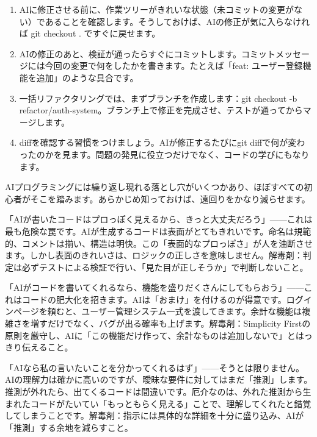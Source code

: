 \begin{enumerate}
  \item AIに修正させる前に、作業ツリーがきれいな状態（未コミットの変更がない）であることを確認します。そうしておけば、AIの修正が気に入らなければ git checkout . ですぐに戻せます。
  \item AIの修正のあと、検証が通ったらすぐにコミットします。コミットメッセージには今回の変更で何をしたかを書きます。たとえば「feat: ユーザー登録機能を追加」のような具合です。
  \item 一括リファクタリングでは、まずブランチを作成します：git checkout -b refactor/auth-system。ブランチ上で修正を完成させ、テストが通ってからマージします。
  \item diffを確認する習慣をつけましょう。AIが修正するたびにgit diffで何が変わったのかを見ます。問題の発見に役立つだけでなく、コードの学びにもなります。
\end{enumerate}


AIプログラミングには繰り返し現れる落とし穴がいくつかあり、ほぼすべての初心者がそこを踏みます。あらかじめ知っておけば、遠回りをかなり減らせます。


「AIが書いたコードはプロっぽく見えるから、きっと大丈夫だろう」——これは最も危険な罠です。AIが生成するコードは表面がとてもきれいです。命名は規範的、コメントは揃い、構造は明快。この「表面的なプロっぽさ」が人を油断させます。しかし表面のきれいさは、ロジックの正しさを意味しません。解毒剤：判定は必ずテストによる検証で行い、「見た目が正しそうか」で判断しないこと。


「AIがコードを書いてくれるなら、機能を盛りだくさんにしてもらおう」——これはコードの肥大化を招きます。AIは「おまけ」を付けるのが得意です。ログインページを頼むと、ユーザー管理システム一式を渡してきます。余計な機能は複雑さを増すだけでなく、バグが出る確率も上げます。解毒剤：Simplicity Firstの原則を厳守し、AIに「この機能だけ作って、余計なものは追加しないで」とはっきり伝えること。


「AIなら私の言いたいことを分かってくれるはず」——そうとは限りません。AIの理解力は確かに高いのですが、曖昧な要件に対してはまだ「推測」します。推測が外れたら、出てくるコードは間違いです。厄介なのは、外れた推測から生まれたコードがたいてい「もっともらく見える」ことで、理解してくれたと錯覚してしまうことです。解毒剤：指示には具体的な詳細を十分に盛り込み、AIが「推測」する余地を減らすこと。

